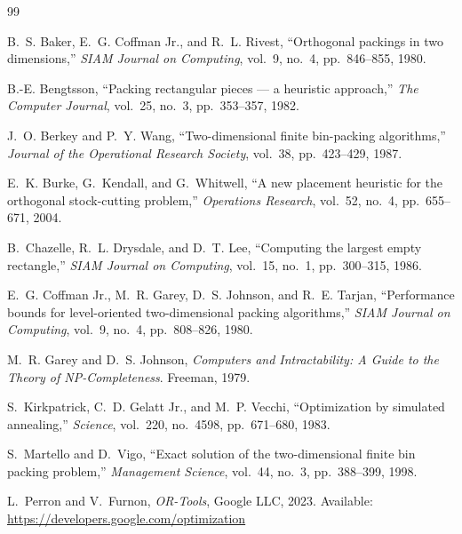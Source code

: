 \documentclass[11pt,a4paper]{article}
\begin{document}
\begin{thebibliography}{99}

B.~S. Baker, E.~G. Coffman Jr., and R.~L. Rivest,
``Orthogonal packings in two dimensions,''
\textit{SIAM Journal on Computing}, vol.~9, no.~4, pp.~846--855, 1980.

B.-E. Bengtsson,
``Packing rectangular pieces --- a heuristic approach,''
\textit{The Computer Journal}, vol.~25, no.~3, pp.~353--357, 1982.

J.~O. Berkey and P.~Y. Wang,
``Two-dimensional finite bin-packing algorithms,''
\textit{Journal of the Operational Research Society}, vol.~38, pp.~423--429, 1987.

E.~K. Burke, G.~Kendall, and G.~Whitwell,
``A new placement heuristic for the orthogonal stock-cutting problem,''
\textit{Operations Research}, vol.~52, no.~4, pp.~655--671, 2004.

B.~Chazelle, R.~L. Drysdale, and D.~T. Lee,
``Computing the largest empty rectangle,''
\textit{SIAM Journal on Computing}, vol.~15, no.~1, pp.~300--315, 1986.

E.~G. Coffman Jr., M.~R. Garey, D.~S. Johnson, and R.~E. Tarjan,
``Performance bounds for level-oriented two-dimensional packing algorithms,''
\textit{SIAM Journal on Computing}, vol.~9, no.~4, pp.~808--826, 1980.

M.~R. Garey and D.~S. Johnson,
\textit{Computers and Intractability: A Guide to the Theory of NP-Completeness}.
Freeman, 1979.

S.~Kirkpatrick, C.~D. Gelatt Jr., and M.~P. Vecchi,
``Optimization by simulated annealing,''
\textit{Science}, vol.~220, no.~4598, pp.~671--680, 1983.

S.~Martello and D.~Vigo,
``Exact solution of the two-dimensional finite bin packing problem,''
\textit{Management Science}, vol.~44, no.~3, pp.~388--399, 1998.

L.~Perron and V.~Furnon,
\textit{OR-Tools}, Google LLC, 2023.
Available: \url{https://developers.google.com/optimization}

\end{thebibliography}
\end{document}
